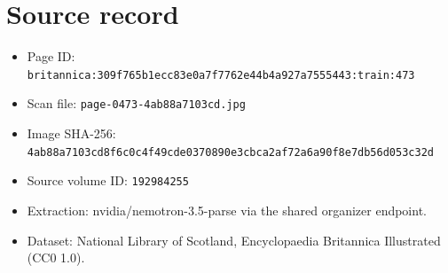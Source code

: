 \documentclass{article}
\begin{document}
\section*{Source record}
\begin{itemize}
\item Page ID: \texttt{britannica:309f765b1ecc83e0a7f7762e44b4a927a7555443:train:473}
\item Scan file: \texttt{page-0473-4ab88a7103cd.jpg}
\item Image SHA-256: \texttt{4ab88a7103cd8f6c0c4f49cde0370890e3cbca2af72a6a90f8e7db56d053c32d}
\item Source volume ID: \texttt{192984255}
\item Extraction: nvidia/nemotron-3.5-parse via the shared organizer endpoint.
\item Dataset: National Library of Scotland, Encyclopaedia Britannica Illustrated (CC0 1.0).
\end{itemize}
\end{document}
